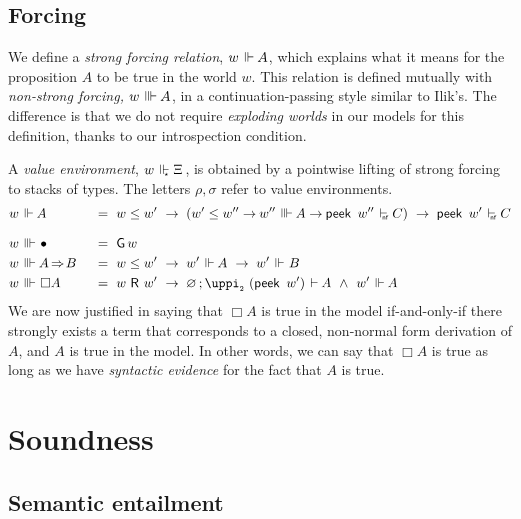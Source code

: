 \documentclass[submission,copyright,creativecommons,sharealike,backref=page]{eptcs}
\newcommand{\Xis}{\rlap{$\Xi$}\hphantom{A}}
\newcommand{\sA}{\mkern-2muA}
\newcommand{\R}{\mathrel{\rlap{$\mkern.75mu\textsf{R}$}\hphantom{\subseteq}}}
\renewcommand{\:}{\mathop{\mkern3mu:\mkern3mu}}
\renewcommand{\.}{\mathop{\mkern3mu.\mkern3mu}}
\renewcommand{\;}{\mathop{;}}
\renewcommand{\,}{\mathop{,}}
\newcommand{\conj}{\mathrel{\wedge}}
\newcommand{\e}{\mathrel{\mkern2mu\vdash\mkern1mu}}
\newcommand{\enf}{\mathrel{\mkern2mu\vdash_{\mkern-9mu\scriptscriptstyle{\textsf{nf}}}}}
\newcommand{\ee}{\mathrel{\mkern2mu\Vdash\mkern1mu}}
\newcommand{\ees}{\mathrel{\mkern2mu\Vdash_{\mkern-9mu\scriptscriptstyle{\star}}}}
\newcommand{\eee}{\mathrel{\mkern2mu\Vvdash\mkern1mu}}
\renewcommand{\r}{\mathrel{\rightarrow\mkern-1mu}}
\newcommand{\rf}{\mathop{\Rightarrow\mkern-1mu}}
\newcommand{\peek}{\operatorname{\textsf{peek}}}
\newcommand{\piii}{\operatorname{\uppi_{\scriptscriptstyle{2}}}}
\newcommand{\G}{\operatorname{\textsf{G}}}
\newcommand{\base}{\mathop{\bullet}}
\renewcommand{\O}{\varnothing}
\theoremstyle{mystyle}
\begin{document}
\subsection{Forcing}

We define a \emph{strong forcing relation}, $w \ee \sA$, which explains what it means for the proposition $A$ to be true in the world $w$.  This relation is defined mutually with \emph{non-strong forcing,} $w \eee \sA$, in a continuation-passing style similar to Ilik's.  The difference is that we do not require \emph{exploding worlds} in our models for this definition, thanks to our introspection condition.

A \emph{value environment}, $w \ees \Xis$, is obtained by a pointwise lifting of strong forcing to stacks of types.  The letters $\rho, \sigma$ refer to value environments.
\begin{alignat*}{2}
  & w \ee \sA        && ~=~ w \le w' ~\r~ (w' \le w'' \r w'' \eee \sA \r \peek~w'' \enf C) ~\r~ \peek~w' \enf C\\[.5\baselineskip]
  & w \eee \base     && ~=~ \G w\\
  & w \eee \sA \rf B && ~=~ w \le w' ~\r~ w' \ee \sA ~\r~ w' \ee B\\
  & w \eee \Box A    && ~=~ w \R w' ~\r~ \O \; \piii~(\peek~w') \e \sA~\conj~w' \ee \sA
\end{alignat*}
We are now justified in saying that $\Box A$ is true in the model if-and-only-if there strongly exists a term that corresponds to a closed, non-normal form derivation of $A$, and $A$ is true in the model.  In other words, we can say that $\Box A$ is true as long as we have \emph{syntactic evidence} for the fact that $A$ is true.


\section{Soundness}\label{Soundness}

\subsection{Semantic entailment}
\end{document}
